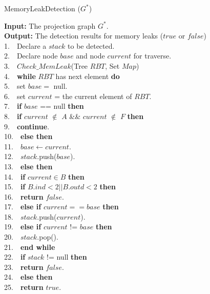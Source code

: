\begin{algorithm}
\caption{MemoryLeakDetection ($G^*$)}\label{alg:mld}
\textbf{Input:} The projection graph $G^*$.\\
\textbf{Output:} The detection results for memory leaks ($\mathit{true}$ or $\mathit{false}$)\\
1.\ \	Declare a $\mathit{stack}$ to be detected.\\
2.\ \ 	Declare node $\mathit{base}$ and node $\mathit{current}$ for traverse.\\
3.\ \        $\mathit{Check\_MemLeak}$(Tree $\mathit{RBT}$, Set $\mathit{Map}$)\\
4.\ \ 	\textbf{while} $\mathit{RBT}$ has next element \textbf{do} \\
5.\ \ \quad	   set $\mathit{base} =$ null.\\
6.\ \ \quad	   set $\mathit{current}$ = the current element of $\mathit{RBT}$.\\
7.\ \ \quad	    \textbf{if} $\mathit{base}$ == null \textbf{then}\\
8.\ \ \quad \quad	        \textbf{if} $\mathit{current}$ $\notin$ $A$ \&\& $\mathit{current}$ $\notin$ $F$ \textbf{then}\\
9.\ \ \quad \quad \quad	            \textbf{continue}.\\
10.\ \ \quad\quad	        \textbf{else then}\\
11.\ \ \quad\quad \quad	            $\mathit{base} \leftarrow \mathit{current}$.\\
12.\ \ \quad\quad \quad	            $\mathit{stack}$.push($\mathit{base}$).\\
13.\ \ \quad	    \textbf{else then}\\
14.\ \ \quad \quad       \textbf{if} $\mathit{current}\in B$ \textbf{then}\\
15.\ \ \quad \quad \quad            \textbf{if} $B.ind<2 || B.outd<2$ \textbf{then}\\
16.\ \ \quad \quad \quad \quad	                \textbf{return} $\mathit{false}$.\\
17.\ \ \quad \quad \quad        \textbf{else if} $\mathit{current} == \mathit{base}$ \textbf{then}\\
18.\ \ \quad \quad \quad \quad	            $\mathit{stack}$.push($\mathit{current}$).\\
19.\ \ \quad \quad \quad	        \textbf{else if} $\mathit{current}$ != $\mathit{base}$ \textbf{then}\\
20.\ \ \quad \quad \quad \quad	            $\mathit{stack}$.pop().\\
21.\ \ 	\textbf{end while}\\
22.\ \ 	\textbf{if} $\mathit{stack}$ != null \textbf{then}\\
23.\ \ \quad    \textbf{return} $\mathit{false}$.\\
24.\ \ 	\textbf{else then}\\
25.\ \ \quad	    \textbf{return} $\mathit{true}$.\\
\end{algorithm}

